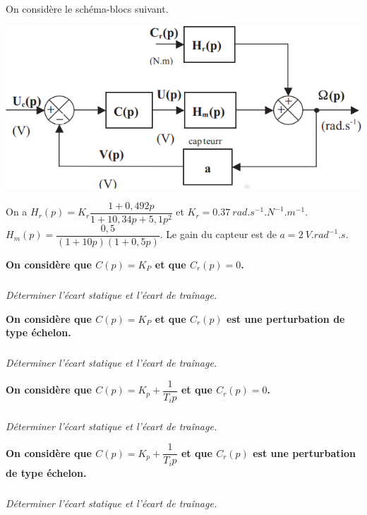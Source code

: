 \documentclass[10pt,fleqn]{article} %
\begin{document}
\def\pathfig{images}

\vspace{4.5cm}
\pagestyle{fancy}
\thispagestyle{plain}

\def\columnseprulecolor{\color{ocre}}
\setlength{\columnseprule}{0.4pt} 

\def\pathfig{images}

\ifprof
\else
\begin{multicols}{2}
\fi

On considère le schéma-blocs suivant. 
\begin{center}
\includegraphics[width=\linewidth]{images/fig_01}
\end{center}


On a $H_r(p)=K_r \dfrac{1+0,492 p}{1+10,34p+5,1p^2}$ et $K_r = \SI{0,37}{rad.s^{-1}.N^{-1}.m^{-1}}$.
$H_m(p)=\dfrac{0,5}{\left(1+10p \right)\left(1+0,5p \right)}$. Le gain du capteur est de $a=\SI{2}{V.rad^{-1}.s}$.

\textbf{On considère que $C(p)=K_P$ et que $C_r(p)=0$.}


\subparagraph{}\textit{Déterminer l'écart statique et l'écart de traînage.}

\textbf{On considère que $C(p)=K_P$ et que $C_r(p)$ est une perturbation de type échelon.}

\subparagraph{}\textit{Déterminer l'écart statique et l'écart de traînage.}

\textbf{On considère que $C(p)=K_p+\dfrac{1}{T_i p} $ et que $C_r(p)=0$.}

\subparagraph{}\textit{Déterminer l'écart statique et l'écart de traînage.}

\textbf{On considère que $C(p)=K_p+\dfrac{1}{T_i p} $ et que $C_r(p)$ est une perturbation de type échelon.}
\subparagraph{}\textit{Déterminer l'écart statique et l'écart de traînage.}

\ifprof
\else
\end{multicols}
\fi
\end{document}

